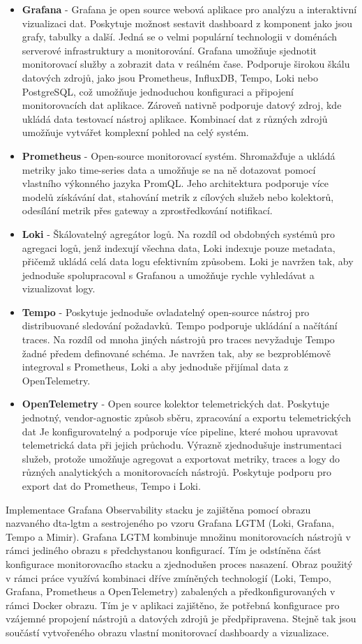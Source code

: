 \begin{itemize}
  \item \textbf{Grafana} - Grafana je open source webová aplikace pro analýzu a interaktivní vizualizaci dat. Poskytuje možnost sestavit dashboard z komponent jako jsou grafy, tabulky a další. Jedná se o velmi populární technologii v doménách serverové infrastruktury a monitorování. Grafana umožňuje sjednotit monitorovací služby a zobrazit data v reálném čase. Podporuje širokou škálu datových zdrojů, jako jsou Prometheus, InfluxDB, Tempo, Loki nebo PostgreSQL, což umožňuje jednoduchou konfiguraci a připojení monitorovacích dat aplikace. Zároveň nativně podporuje datový zdroj, kde ukládá data testovací nástroj aplikace. Kombinací dat z různých zdrojů umožňuje vytvářet komplexní pohled na celý systém.
  \item \textbf{Prometheus} - Open-source monitorovací systém. Shromažďuje a ukládá metriky jako time-series data a umožňuje se na ně dotazovat pomocí vlastního výkonného jazyka PromQL. Jeho architektura podporuje více modelů získávání dat, stahování metrik z cílových služeb nebo kolektorů, odesílání metrik přes gateway a zprostředkování notifikací.
  \item \textbf{Loki} - Škálovatelný agregátor logů. Na rozdíl od obdobných systémů pro agregaci logů, jenž indexují všechna data, Loki indexuje pouze metadata, přičemž ukládá celá data logu efektivním způsobem. Loki je navržen tak, aby jednoduše spolupracoval s Grafanou a umožňuje rychle vyhledávat a vizualizovat logy.
  \item \textbf{Tempo} - Poskytuje jednoduše ovladatelný open-source nástroj pro distribuované sledování požadavků. Tempo podporuje ukládání a načítání traces. Na rozdíl od mnoha jiných nástrojů pro traces nevyžaduje Tempo žadné předem definované schéma. Je navržen tak, aby se bezproblémově integroval s Prometheus, Loki a aby jednoduše přijímal data z OpenTelemetry.
  \item \textbf{OpenTelemetry} - Open source kolektor telemetrických dat. Poskytuje jednotný, vendor-agnostic způsob sběru, zpracování a exportu telemetrických dat  Je konfigurovatelný a podporuje více pipeline, které mohou upravovat telemetrická data při jejich průchodu. Výrazně zjednodušuje instrumentaci služeb, protože umožňuje agregovat a exportovat metriky, traces a logy do různých analytických a monitorovacích nástrojů. Poskytuje podporu pro export dat do Prometheus, Tempo i Loki.
\end{itemize}

Implementace Grafana Observability stacku je zajištěna pomocí obrazu nazvaného dta-lgtm a sestrojeného po vzoru Grafana LGTM (Loki, Grafana, Tempo a Mimir). Grafana LGTM kombinuje množinu monitorovacích nástrojů v rámci jediného obrazu s předchystanou konfigurací. Tím je odstíněna část konfigurace monitorovacího stacku a zjednodušen proces nasazení. Obraz použitý v rámci práce využívá kombinaci dříve zmíněných technologií (Loki, Tempo, Grafana, Prometheus a OpenTelemetry) zabalených a předkonfigurovaných v rámci Docker obrazu. Tím je v aplikaci zajištěno, že potřebná konfigurace pro vzájemné propojení nástrojů a datových zdrojů je předpřipravena. Stejně tak jsou součástí vytvořeného obrazu vlastní monitorovací dashboardy a vizualizace.

